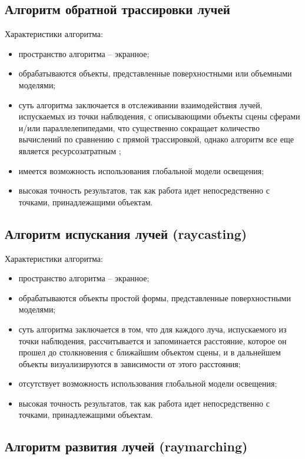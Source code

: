 \subsection{Алгоритм обратной трассировки лучей}

Характеристики алгоритма:
\begin{itemize}
    \item пространство алгоритма -- экранное;
    \item обрабатываются объекты, представленные поверхностными или объемными моделями;
    \item суть алгоритма заключается в отслеживании взаимодействия лучей, испускаемых из точки наблюдения, с описывающими объекты сцены сферами и/или параллелепипедами, что существенно сокращает количество вычислений по сравнению с прямой трассировкой, однако алгоритм все еще является ресурсозатратным \cite{yanova, porev};
    \item имеется возможность использования глобальной модели освещения;
    \item высокая точность результатов, так как работа идет непосредственно с точками, принадлежащими объектам.
\end{itemize}

\subsection{Алгоритм испускания лучей (raycasting)}

Характеристики алгоритма:
\begin{itemize}
    \item пространство алгоритма -- экранное;
    \item обрабатываются объекты простой формы, представленные поверхностными моделями;
    \item суть алгоритма заключается в том, что для каждого луча, испускаемого из точки наблюдения, рассчитывается и запоминается расстояние, которое он прошел до столкновения с ближайшим объектом сцены, и в дальнейшем объекты визуализируются в зависимости от этого расстояния;
    \item отсутствует возможность использования глобальной модели освещения;
    \item высокая точность результатов, так как работа идет непосредственно с точками, принадлежащими объектам. \cite{evstratov, raycasting, habrraycasting}
\end{itemize}

\subsection{Алгоритм развития лучей (raymarching)}

